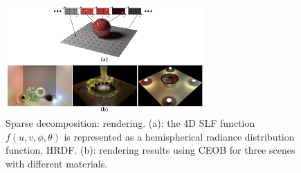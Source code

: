 \begin{figure}[ht]
  \centering
  \includegraphics[width=3in]{images/rendering_learning}
  \caption{Sparse decomposition: rendering\cite{miandji2013learning}. (a): the 4D SLF function $f(u,v,\phi,\theta)$ is represented as a hemispherical radiance distribution function, HRDF. (b): rendering results using CEOB for three scenes with different materials.}
\end{figure} 